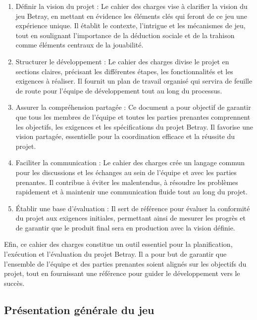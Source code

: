 \documentclass[
	article,			%
	11pt,				%
	oneside,			%
	a4paper,			%
	chapter=TITLE,
	french,			%
	sumario=tradicional
	]{base_nt}
\begin{document}
\begin{enumerate}
    \item Définir la vision du projet : Le cahier des charges vise à clarifier la vision du jeu Betray, en mettant en évidence les éléments clés qui feront de ce jeu une expérience unique. Il établit le contexte, l'intrigue et les mécanismes de jeu, tout en soulignant l'importance de la déduction sociale et de la trahison comme éléments centraux de la jouabilité.

    \item Structurer le développement : Le cahier des charges divise le projet en sections claires, précisant les différentes étapes, les fonctionnalités et les exigences à réaliser. Il fournit un plan de travail organisé qui servira de feuille de route pour l'équipe de développement tout au long du processus.

    \item Assurer la compréhension partagée : Ce document a pour objectif de garantir que tous les membres de l'équipe et toutes les parties prenantes comprennent les objectifs, les exigences et les spécifications du projet Betray. Il favorise une vision partagée, essentielle pour la coordination efficace et la réussite du projet.

    \item Faciliter la communication : Le cahier des charges crée un langage commun pour les discussions et les échanges au sein de l'équipe et avec les parties prenantes. Il contribue à éviter les malentendus, à résoudre les problèmes rapidement et à maintenir une communication fluide tout au long du projet.

    \item Établir une base d'évaluation : Il sert de référence pour évaluer la conformité du projet aux exigences initiales, permettant ainsi de mesurer les progrès et de garantir que le produit final sera en production avec la vision définie.
    
\end{enumerate}

Efin, ce cahier des charges constitue un outil essentiel pour la planification, l'exécution et l'évaluation du projet Betray. Il a pour but de garantir que l'ensemble de l'équipe et des parties prenantes soient alignés sur les objectifs du projet, tout en fournissant une référence pour guider le développement vers le succès.

\subsection{Présentation générale du jeu}
\end{document}
